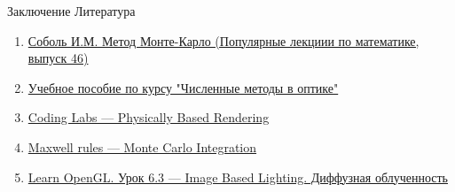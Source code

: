 \documentclass{beamer}
\begin{document}
	\begin{frame}{Заключение}
		Литература
		\begin{enumerate}
			\item \href{https://math.ru/lib/plm/46}{Соболь И.М. Метод Монте-Карло (Популярные лекциии по математике, выпуск 46)}
			\item \href{http://aco.ifmo.ru/el_books/numerical_methods/lectures/glava2_2.html}{Учебное пособие по курсу "Численные методы в оптике"}
			\item \href{http://www.codinglabs.net/article_physically_based_rendering.aspx}{Coding Labs --- Physically Based Rendering}
			\item \href{https://www.maxwellrules.com/math/montecarlo_integration.html}{Maxwell rules --- Monte Carlo Integration}
			\item \href{https://habr.com/ru/articles/426987/}{Learn OpenGL. Урок 6.3 --- Image Based Lighting. Диффузная облученность}
		\end{enumerate}

	\end{frame}
	
\end{document}
